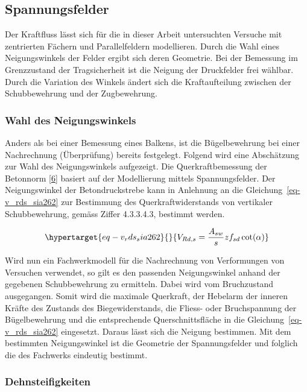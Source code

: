 \documentclass[
  12pt,
  letterpaper,
  egregdoesnotlikesansseriftitles]{scrreprt}
\begin{document}
\hypertarget{spannungsfelder}{%
\subsection{Spannungsfelder}\label{spannungsfelder}}

Der Kraftfluss lässt sich für die in dieser Arbeit untersuchten Versuche
mit zentrierten Fächern und Parallelfeldern modellieren. Durch die Wahl
eines Neigungswinkels der Felder ergibt sich deren Geometrie. Bei der
Bemessung im Grenzzustand der Tragsicherheit ist die Neigung der
Druckfelder frei wählbar. Durch die Variation des Winkels ändert sich
die Kraftaufteilung zwischen der Schubbewehrung und der Zugbewehrung.

\hypertarget{wahl-des-neigungswinkels}{%
\subsubsection{Wahl des
Neigungswinkels}\label{wahl-des-neigungswinkels}}

Anders als bei einer Bemessung eines Balkens, ist die Bügelbewehrung bei
einer Nachrechnung (Überprüfung) bereits festgelegt. Folgend wird eine
Abschätzung zur Wahl des Neigungswinkels aufgezeigt. Die
Querkraftbemessung der Betonnorm
{[}\protect\hyperlink{ref-SIA2013a}{6}{]} basiert auf der Modellierung
mittels Spannungsfelder. Der Neigungswinkel der Betondruckstrebe kann in
Anlehnung an die Gleichung~\ref{eq-v_rds_sia262} zur Bestimmung des
Querkraftwiderstands von vertikaler Schubbewehrung, gemäss Ziffer
4.3.3.4.3, bestimmt werden.

\begin{equation}\protect\hypertarget{eq-v_rds_sia262}{}{
V_{Rd,s} = \frac{A_{sw}}{s} z f_{sd} \cot(\alpha)
}\label{eq-v_rds_sia262}\end{equation}

Wird nun ein Fachwerkmodell für die Nachrechnung von Verformungen von
Versuchen verwendet, so gilt es den passenden Neigungswinkel anhand der
gegebenen Schubbewehrung zu ermitteln. Dabei wird vom Bruchzustand
ausgegangen. Somit wird die maximale Querkraft, der Hebelarm der inneren
Kräfte des Zustands des Biegewiderstands, die Fliess- oder Bruchspannung
der Bügelbewehrung und die entsprechende Querschnittsfläche in die
Gleichung~\ref{eq-v_rds_sia262} eingesetzt. Daraus lässt sich die
Neigung bestimmen. Mit dem bestimmten Neigungswinkel ist die Geometrie
der Spannungsfelder und folglich die des Fachwerks eindeutig bestimmt.

\hypertarget{dehnsteifigkeiten}{%
\subsubsection{Dehnsteifigkeiten}\label{dehnsteifigkeiten}}
\end{document}
